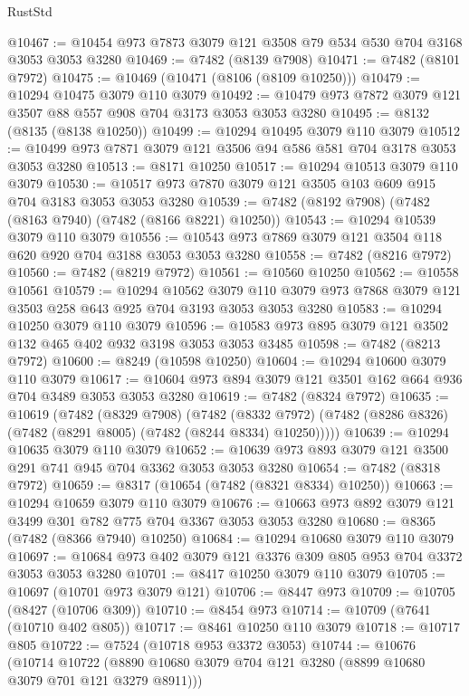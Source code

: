 \begin{lexlean}{RustStd}
\begin{coremodule}
{\begin{coremodule}
{{{{{{{{{{{{{{{{{{{{{{{{{{{{{{{{@10467 := @10454 @973 @7873 @3079 @121 @3508 @79 @534 @530 @704 @3168 @3053 @3053 @3280
@10469 := @7482 (@8139 @7908)
@10471 := @7482 (@8101 @7972)
@10475 := @10469 (@10471 (@8106 (@8109 @10250)))
@10479 := @10294 @10475 @3079 @110 @3079
@10492 := @10479 @973 @7872 @3079 @121 @3507 @88 @557 @908 @704 @3173 @3053 @3053 @3280
@10495 := @8132 (@8135 (@8138 @10250))
@10499 := @10294 @10495 @3079 @110 @3079
@10512 := @10499 @973 @7871 @3079 @121 @3506 @94 @586 @581 @704 @3178 @3053 @3053 @3280
@10513 := @8171 @10250
@10517 := @10294 @10513 @3079 @110 @3079
@10530 := @10517 @973 @7870 @3079 @121 @3505 @103 @609 @915 @704 @3183 @3053 @3053 @3280
@10539 := @7482 (@8192 @7908) (@7482 (@8163 @7940) (@7482 (@8166 @8221) @10250))
@10543 := @10294 @10539 @3079 @110 @3079
@10556 := @10543 @973 @7869 @3079 @121 @3504 @118 @620 @920 @704 @3188 @3053 @3053 @3280
@10558 := @7482 (@8216 @7972)
@10560 := @7482 (@8219 @7972)
@10561 := @10560 @10250
@10562 := @10558 @10561
@10579 := @10294
    @10562
    @3079
    @110
    @3079
    @973
    @7868
    @3079
    @121
    @3503
    @258
    @643
    @925
    @704
    @3193
    @3053
    @3053
    @3280
@10583 := @10294 @10250 @3079 @110 @3079
@10596 := @10583 @973 @895 @3079 @121 @3502 @132 @465 @402 @932 @3198 @3053 @3053 @3485
@10598 := @7482 (@8213 @7972)
@10600 := @8249 (@10598 @10250)
@10604 := @10294 @10600 @3079 @110 @3079
@10617 := @10604 @973 @894 @3079 @121 @3501 @162 @664 @936 @704 @3489 @3053 @3053 @3280
@10619 := @7482 (@8324 @7972)
@10635 := @10619
    (@7482
      (@8329 @7908)
      (@7482
        (@8332 @7972)
        (@7482 (@8286 @8326) (@7482 (@8291 @8005) (@7482 (@8244 @8334) @10250)))))
@10639 := @10294 @10635 @3079 @110 @3079
@10652 := @10639 @973 @893 @3079 @121 @3500 @291 @741 @945 @704 @3362 @3053 @3053 @3280
@10654 := @7482 (@8318 @7972)
@10659 := @8317 (@10654 (@7482 (@8321 @8334) @10250))
@10663 := @10294 @10659 @3079 @110 @3079
@10676 := @10663 @973 @892 @3079 @121 @3499 @301 @782 @775 @704 @3367 @3053 @3053 @3280
@10680 := @8365 (@7482 (@8366 @7940) @10250)
@10684 := @10294 @10680 @3079 @110 @3079
@10697 := @10684 @973 @402 @3079 @121 @3376 @309 @805 @953 @704 @3372 @3053 @3053 @3280
@10701 := @8417 @10250 @3079 @110 @3079
@10705 := @10697 (@10701 @973 @3079 @121)
@10706 := @8447 @973
@10709 := @10705 (@8427 (@10706 @309))
@10710 := @8454 @973
@10714 := @10709 (@7641 (@10710 @402 @805))
@10717 := @8461 @10250 @110 @3079
@10718 := @10717 @805
@10722 := @7524 (@10718 @953 @3372 @3053)
@10744 := @10676
    (@10714 @10722 (@8890 @10680 @3079 @704 @121 @3280 (@8899 @10680 @3079 @701 @121 @3279 @8911)))
}}}}}}}}}}}}}}}}}}}}}}}}}}}}}}}}
\end{coremodule}}
\end{coremodule}
\end{lexlean}
